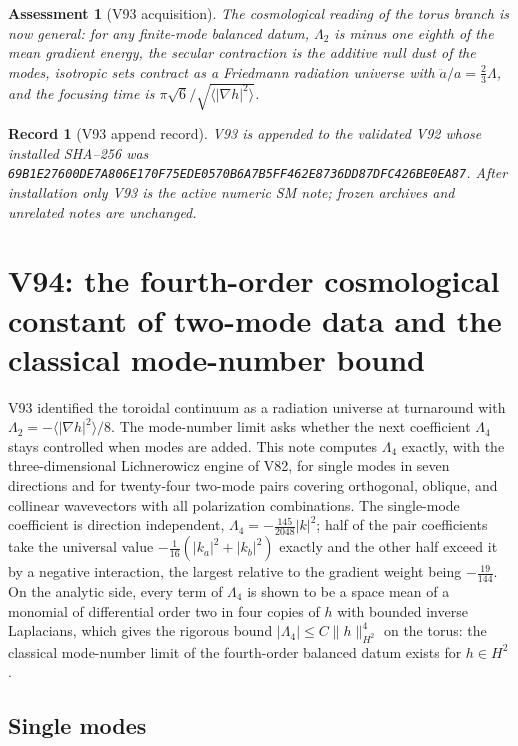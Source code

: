 \documentclass[11pt]{article}
\newtheorem{assessment}[theorem]{Assessment}
\newtheorem{record}[theorem]{Record}
\theoremstyle{remark}
\begin{document}
\begin{assessment}[V93 acquisition]
\label{ass:v19v93}
The cosmological reading of the torus branch is now general: for any
finite-mode balanced datum, \(\Lambda_2\) is minus one eighth of the
mean gradient energy, the secular contraction is the additive null
dust of the modes, isotropic sets contract as a Friedmann radiation
universe with \(\ddot a/a=\tfrac23\Lambda\), and the focusing time is
\(\pi\sqrt6/\sqrt{\langle|\nabla h|^2\rangle}\).
\end{assessment}

\begin{record}[V93 append record]
\label{rec:v19v93}
V93 is appended to the validated V92 whose installed SHA--256 was
\texttt{69B1E27600DE7A806E170F75EDE0570B6A7B5FF462E8736DD87DFC426BE0EA87}.
After installation only V93 is the active numeric SM note; frozen
archives and unrelated notes are unchanged.
\end{record}


\section{V94: the fourth-order cosmological constant of two-mode data and the classical mode-number bound}
\label{sec:v19v94}

V93 identified the toroidal continuum as a radiation universe at
turnaround with \(\Lambda_2=-\langle|\nabla h|^2\rangle/8\).  The
mode-number limit asks whether the next coefficient
\(\Lambda_4\) stays controlled when modes are added.  This note
computes \(\Lambda_4\) exactly, with the three-dimensional
Lichnerowicz engine of V82, for single modes in seven directions and
for twenty-four two-mode pairs covering orthogonal, oblique, and
collinear wavevectors with all polarization combinations.  The
single-mode coefficient is direction independent,
\(\Lambda_4=-\tfrac{145}{2048}|k|^2\); half of the pair coefficients
take the universal value \(-\tfrac1{16}(|k_a|^2+|k_b|^2)\) exactly and
the other half exceed it by a negative interaction, the largest
relative to the gradient weight being \(-\tfrac{19}{144}\).  On the
analytic side, every term of \(\Lambda_4\) is shown to be a space mean
of a monomial of differential order two in four copies of \(h\) with
bounded inverse Laplacians, which gives the rigorous bound
\(|\Lambda_4|\leq C\|h\|_{H^2}^4\) on the torus: the classical
mode-number limit of the fourth-order balanced datum exists for
\(h\in H^2\).

\subsection{Single modes}
\end{document}
